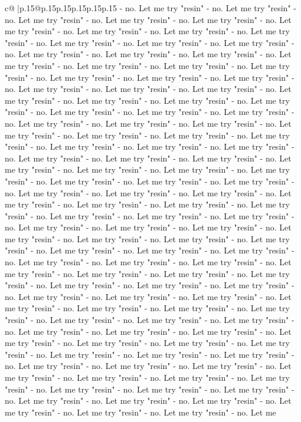 \documentclass{article}
\begin{document}
{\begin{supertabular}{c@{$\;$}|p{.15\linewidth}@{}p{.15\linewidth}p{.15\linewidth}p{.15\linewidth}p{.15\linewidth}p{.15\linewidth}}
{{{{-} no. Let me try "resin" {-} no. Let me try "resin" {-} no. Let me try "resin" {-} no. Let me try "resin" {-} no. Let me try "resin" {-} no. Let me try "resin" {-} no. Let me try "resin" {-} no. Let me try "resin" {-} no. Let me try "resin" {-} no. Let me try "resin" {-} no. Let me try "resin" {-} no. Let me try "resin" {-} no. Let me try "resin" {-} no. Let me try "resin" {-} no. Let me try "resin" {-} no. Let me try "resin" {-} no. Let me try "resin" {-} no. Let me try "resin" {-} no. Let me try "resin" {-} no. Let me try "resin" {-} no. Let me try "resin" {-} no. Let me try "resin" {-} no. Let me try "resin" {-} no. Let me try "resin" {-} no. Let me try "resin" {-} no. Let me try "resin" {-} no. Let me try "resin" {-} no. Let me try "resin" {-} no. Let me try "resin" {-} no. Let me try "resin" {-} no. Let me try "resin" {-} no. Let me try "resin" {-} no. Let me try "resin" {-} no. Let me try "resin" {-} no. Let me try "resin" {-} no. Let me try "resin" {-} no. Let me try "resin" {-} no. Let me try "resin" {-} no. Let me try "resin" {-} no. Let me try "resin" {-} no. Let me try "resin" {-} no. Let me try "resin" {-} no. Let me try "resin" {-} no. Let me try "resin" {-} no. Let me try "resin" {-} no. Let me try "resin" {-} no. Let me try "resin" {-} no. Let me try "resin" {-} no. Let me try "resin" {-} no. Let me try "resin" {-} no. Let me try "resin" {-} no. Let me try "resin" {-} no. Let me try "resin" {-} no. Let me try "resin" {-} no. Let me try "resin" {-} no. Let me try "resin" {-} no. Let me try "resin" {-} no. Let me try "resin" {-} no. Let me try "resin" {-} no. Let me try "resin" {-} no. Let me try "resin" {-} no. Let me try "resin" {-} no. Let me try "resin" {-} no. Let me try "resin" {-} no. Let me try "resin" {-} no. Let me try "resin" {-} no. Let me try "resin" {-} no. Let me try "resin" {-} no. Let me try "resin" {-} no. Let me try "resin" {-} no. Let me try "resin" {-} no. Let me try "resin" {-} no. Let me try "resin" {-} no. Let me try "resin" {-} no. Let me try "resin" {-} no. Let me try "resin" {-} no. Let me try "resin" {-} no. Let me try "resin" {-} no. Let me try "resin" {-} no. Let me try "resin" {-} no. Let me try "resin" {-} no. Let me try "resin" {-} no. Let me try "resin" {-} no. Let me try "resin" {-} no. Let me try "resin" {-} no. Let me try "resin" {-} no. Let me try "resin" {-} no. Let me try "resin" {-} no. Let me try "resin" {-} no. Let me try "resin" {-} no. Let me try "resin" {-} no. Let me try "resin" {-} no. Let me try "resin" {-} no. Let me try "resin" {-} no. Let me try "resin" {-} no. Let me try "resin" {-} no. Let me try "resin" {-} no. Let me try "resin" {-} no. Let me try "resin" {-} no. Let me try "resin" {-} no. Let me try "resin" {-} no. Let me try "resin" {-} no. Let me try "resin" {-} no. Let me try "resin" {-} no. Let me try "resin" {-} no. Let me try "resin" {-} no. Let me try "resin" {-} no. Let me try "resin" {-} no. Let me try "resin" {-} no. Let me try "resin" {-} no. Let me try "resin" {-} no. Let me try "resin" {-} no. Let me try "resin" {-} no. Let me try "resin" {-} no. Let me try "resin" {-} no. Let me try "resin" {-} no. Let me try "resin" {-} no. Let me try "resin" {-} no. Let me }}}
\end{supertabular}}
\end{document}
